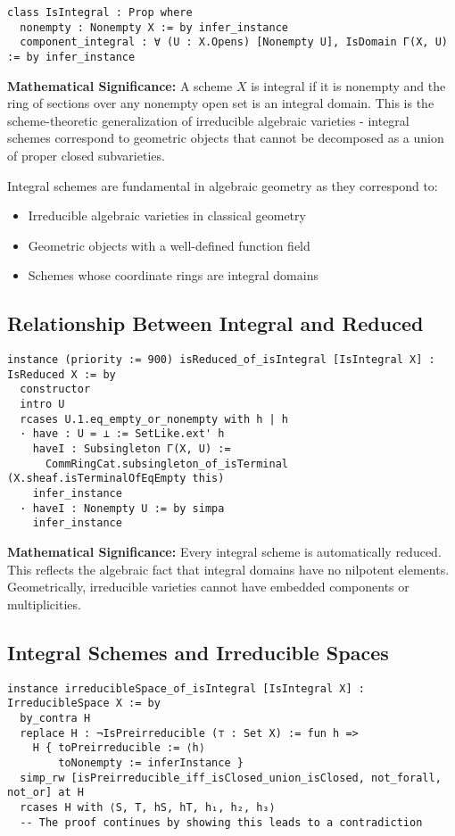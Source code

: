 \documentclass{article}
\theoremstyle{definition}
\begin{document}
\begin{lstlisting}
class IsIntegral : Prop where
  nonempty : Nonempty X := by infer_instance
  component_integral : ∀ (U : X.Opens) [Nonempty U], IsDomain Γ(X, U) := by infer_instance
\end{lstlisting}

\textbf{Mathematical Significance:} A scheme $X$ is integral if it is nonempty and the ring of sections over any nonempty open set is an integral domain. This is the scheme-theoretic generalization of irreducible algebraic varieties - integral schemes correspond to geometric objects that cannot be decomposed as a union of proper closed subvarieties.

Integral schemes are fundamental in algebraic geometry as they correspond to:
\begin{itemize}
\item Irreducible algebraic varieties in classical geometry
\item Geometric objects with a well-defined function field
\item Schemes whose coordinate rings are integral domains
\end{itemize}

\subsection{Relationship Between Integral and Reduced}

\begin{lstlisting}
instance (priority := 900) isReduced_of_isIntegral [IsIntegral X] : IsReduced X := by
  constructor
  intro U
  rcases U.1.eq_empty_or_nonempty with h | h
  · have : U = ⊥ := SetLike.ext' h
    haveI : Subsingleton Γ(X, U) :=
      CommRingCat.subsingleton_of_isTerminal (X.sheaf.isTerminalOfEqEmpty this)
    infer_instance
  · haveI : Nonempty U := by simpa
    infer_instance
\end{lstlisting}

\textbf{Mathematical Significance:} Every integral scheme is automatically reduced. This reflects the algebraic fact that integral domains have no nilpotent elements. Geometrically, irreducible varieties cannot have embedded components or multiplicities.

\subsection{Integral Schemes and Irreducible Spaces}

\begin{lstlisting}
instance irreducibleSpace_of_isIntegral [IsIntegral X] : IrreducibleSpace X := by
  by_contra H
  replace H : ¬IsPreirreducible (⊤ : Set X) := fun h =>
    H { toPreirreducible := ⟨h⟩
        toNonempty := inferInstance }
  simp_rw [isPreirreducible_iff_isClosed_union_isClosed, not_forall, not_or] at H
  rcases H with ⟨S, T, hS, hT, h₁, h₂, h₃⟩
  -- The proof continues by showing this leads to a contradiction
\end{lstlisting}
\end{document}
